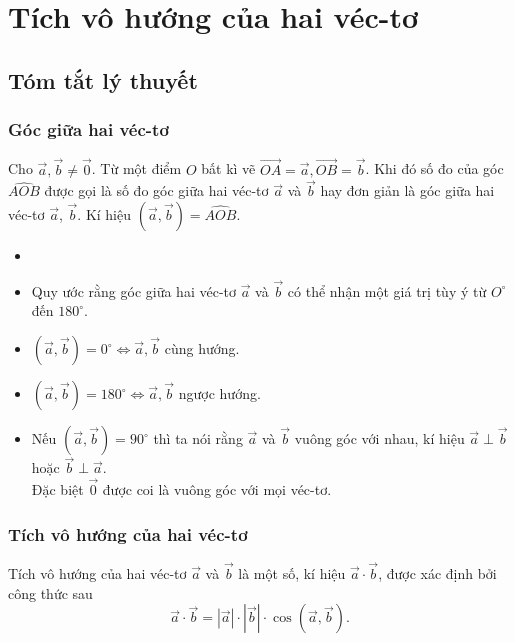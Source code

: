 \setcounter{dang}{0}
\section{Tích vô hướng của hai véc-tơ}
\subsection{Tóm tắt lý thuyết}
\subsubsection{Góc giữa hai véc-tơ}
Cho $\overrightarrow{a}, \overrightarrow{b} \neq \overrightarrow{0}$. Từ một điểm $O$ bất kì vẽ $\overrightarrow{OA} = \overrightarrow{a}, \overrightarrow{OB} = \overrightarrow{b}$.
Khi đó số đo của góc $\widehat{AOB}$ được gọi là số đo góc giữa hai véc-tơ $\overrightarrow{a}$ và $\overrightarrow{b}$ hay đơn giản là góc giữa hai véc-tơ $\overrightarrow{a}$, $\overrightarrow{b}$. Kí hiệu $\left(\overrightarrow{a}, \overrightarrow{b}\right) = \widehat{AOB}$.
\begin{note}
	\begin{itemize}
		\item []
		\item Quy ước rằng góc giữa hai véc-tơ $\overrightarrow{a}$ và $\overrightarrow{b}$ có thể nhận một giá trị tùy ý từ $O^\circ$ đến $180^\circ$.
		\item $\left(\overrightarrow{a}, \overrightarrow{b}\right) = 0^\circ \Leftrightarrow \overrightarrow{a}, \overrightarrow{b}$ cùng hướng.
		\item $\left(\overrightarrow{a}, \overrightarrow{b}\right) = 180^\circ \Leftrightarrow \overrightarrow{a}, \overrightarrow{b}$ ngược hướng.
		\item Nếu $\left(\overrightarrow{a},\overrightarrow{b}\right) = 90^\circ$ thì ta nói rằng $\overrightarrow{a}$ và $\overrightarrow{b}$ vuông góc với nhau, kí hiệu $\overrightarrow{a}\perp \overrightarrow{b}$ hoặc $\overrightarrow{b}\perp \overrightarrow{a}$.\\
		      Đặc biệt $\overrightarrow{0}$ được coi là vuông góc với mọi véc-tơ.
	\end{itemize}
\end{note}
\subsubsection{Tích vô hướng của hai véc-tơ}
\begin{dn}{}
	Tích vô hướng của hai véc-tơ $\overrightarrow{a}$ và $\overrightarrow{b}$	là một số, kí hiệu $\overrightarrow{a}\cdot \overrightarrow{b}$, được xác định bởi công thức sau
	$$\overrightarrow{a} \cdot \overrightarrow{b} = \left|\overrightarrow{a}\right|\cdot \left|\overrightarrow{b}\right|\cdot \cos \left(\overrightarrow{a}, \overrightarrow{b}\right).$$
\end{dn}


